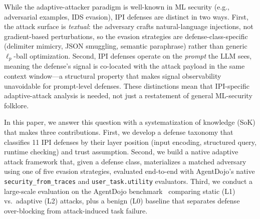 While the adaptive-attacker paradigm is well-known in ML security (e.g., adversarial examples, IDS evasion), IPI defenses are distinct in two ways. First, the attack surface is \emph{textual}: the adversary crafts natural-language injections, not gradient-based perturbations, so the evasion strategies are defense-class-specific (delimiter mimicry, JSON smuggling, semantic paraphrase) rather than generic $\ell_p$-ball optimization. Second, IPI defenses operate on the \emph{prompt} the LLM sees, meaning the defense's signal is co-located with the attack payload in the same context window---a structural property that makes signal observability unavoidable for prompt-level defenses. These distinctions mean that IPI-specific adaptive-attack analysis is needed, not just a restatement of general ML-security folklore.

In this paper, we answer this question with a systematization of knowledge (SoK) that makes three contributions. First, we develop a defense taxonomy that classifies 11 IPI defenses by their layer position (input encoding, structured query, runtime checking) and trust assumption. Second, we build a native adaptive attack framework that, given a defense class, materializes a matched adversary using one of five evasion strategies, evaluated end-to-end with AgentDojo's native \texttt{security\_from\_traces} and \texttt{user\_task.utility} evaluators. Third, we conduct a large-scale evaluation on the AgentDojo benchmark~\cite{debenedetti2024agentdojo,debenedetti2025agentdojo} comparing static (L1) vs.\ adaptive (L2) attacks, plus a benign (L0) baseline that separates defense over-blocking from attack-induced task failure.

